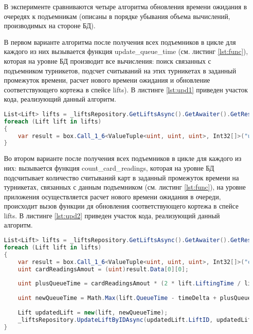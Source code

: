 В эксперименте сравниваются четыре алгоритма обновления времени ожидания в очередях к подъемникам (описаны в порядке убывания объема вычислений, производимых на стороне БД).

В первом варианте алгоритма после получения всех подъемников в цикле для каждого из них вызывается функция update\_queue\_time (см. листинг \ref{lst:func}), которая на уровне БД производит все вычисления: поиск связанных с подъемником турникетов, подсчет считываний на этих турникетах в заданный промежуток времени,  расчет нового времени ожидания и обновление соответствующего кортежа в спейсе lifts). В листинге \ref{lst:upd1} приведен участок кода, реализующий данный алгоритм.

\captionsetup{justification=centering,singlelinecheck=off}
\begin{lstlisting}[label=lst:upd1, caption=Первый вариант алгоритма обновления времени ожидания в очередях к подъемникам, language=csharp]
List<Lift> lifts = _liftsRepository.GetLiftsAsync().GetAwaiter().GetResult(); 
foreach (Lift lift in lifts)
{
	var result = box.Call_1_6<ValueTuple<uint, uint, uint>, Int32[]>("update_queue_time", (ValueTuple.Create(lift.LiftID, (uint)dateFrom.ToUnixTimeSeconds(), (uint)dateTo.ToUnixTimeSeconds()))).GetAwaiter().GetResult();
}
\end{lstlisting}

Во втором варианте после получения всех подъемников в цикле для каждого из них: вызывается функция count\_card\_readings, которая на уровне БД подсчитывает количество считываний карт в заданный промежуток времени на турникетах, связанных с данным подъемником (см. листинг \ref{lst:func}), на уровне приложения осуществляется расчет нового времени ожидания в очереди, происходит вызов функции дя обновления соответствующего кортежа в спейсе lifts. В листинге \ref{lst:upd2} приведен участок кода, реализующий данный алгоритм.

\captionsetup{justification=centering,singlelinecheck=off}
\begin{lstlisting}[label=lst:upd2, caption=Второй вариант алгоритма обновления времени ожидания в очередях к подъемникам, language=csharp]
List<Lift> lifts = _liftsRepository.GetLiftsAsync().GetAwaiter().GetResult();
foreach (Lift lift in lifts)
{
	var result = box.Call_1_6<ValueTuple<uint, uint, uint>, Int32[]>("count_card_readings", (ValueTuple.Create(lift.LiftID, (uint)dateFrom.ToUnixTimeSeconds(), (uint)dateTo.ToUnixTimeSeconds()))).GetAwaiter().GetResult();
	uint cardReadingsAmout = (uint)result.Data[0][0];
	
	uint plusQueueTime = cardReadingsAmout * (2 * lift.LiftingTime / lift.SeatsAmount);
	
	uint newQueueTime = Math.Max(lift.QueueTime - timeDelta + plusQueueTime, 0);
	
	Lift updatedLift = new(lift, newQueueTime);
	_liftsRepository.UpdateLiftByIDAsync(updatedLift.LiftID, updatedLift.LiftName, updatedLift.IsOpen, updatedLift.SeatsAmount, updatedLift.LiftingTime).GetAwaiter().GetResult();
}
\end{lstlisting}


